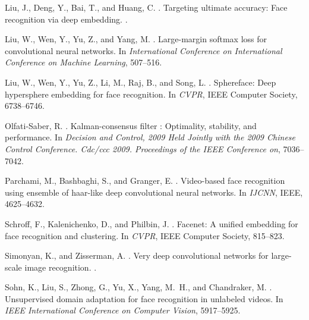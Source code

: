 \documentclass[conference]{acmsiggraph}
\begin{document}
\begin{thebibliography}{\protect{}1998}
{\sc Liu, J., Deng, Y., Bai, T., and Huang, C.}
.
\newblock Targeting ultimate accuracy: Face recognition via deep embedding.
.

{\sc Liu, W., Wen, Y., Yu, Z., and Yang, M.}
.
\newblock Large-margin softmax loss for convolutional neural networks.
\newblock In {\em International Conference on International Conference on
  Machine Learning}, 507--516.

{\sc Liu, W., Wen, Y., Yu, Z., Li, M., Raj, B., and Song, L.}
.
\newblock Sphereface: Deep hypersphere embedding for face recognition.
\newblock In {\em CVPR}, IEEE Computer Society, 6738--6746.

{\sc Olfati-Saber, R.}
.
\newblock Kalman-consensus filter : Optimality, stability, and performance.
\newblock In {\em Decision and Control, 2009 Held Jointly with the 2009 Chinese
  Control Conference. Cdc/ccc 2009. Proceedings of the IEEE Conference on},
  7036--7042.

{\sc Parchami, M., Bashbaghi, S., and Granger, E.}
.
\newblock Video-based face recognition using ensemble of haar-like deep
  convolutional neural networks.
\newblock In {\em IJCNN}, IEEE, 4625--4632.

{\sc Schroff, F., Kalenichenko, D., and Philbin, J.}
.
\newblock Facenet: A unified embedding for face recognition and clustering.
\newblock In {\em CVPR}, IEEE Computer Society, 815--823.

{\sc Simonyan, K., and Zisserman, A.}
.
\newblock Very deep convolutional networks for large-scale image recognition.
.

{\sc Sohn, K., Liu, S., Zhong, G., Yu, X., Yang, M.~H., and Chandraker, M.}
.
\newblock Unsupervised domain adaptation for face recognition in unlabeled
  videos.
\newblock In {\em IEEE International Conference on Computer Vision},
  5917--5925.


\end{thebibliography}
\end{document}
